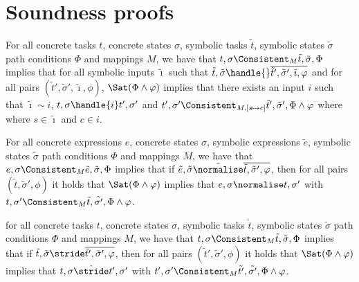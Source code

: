 
\section{Soundness proofs}
\label{sec:soundnessproofs}

\begin{lemma}
  \label{lem:soundhandle}

  For all concrete tasks $t$, concrete states $\sigma$, symbolic tasks $\tilde{t}$, symbolic states $\tilde{\sigma}$ path conditions $\Phi$ and mappings $M$,
  we have that $t,\sigma\Consistent_{M}\tilde{t},\tilde{\sigma},\Phi$ implies
  that for all symbolic inputs $\tilde{\imath}$ such that $\tilde{t},\tilde{\sigma}\handle{}\overline{\tilde{t}',\tilde{\sigma}',\tilde{\imath},\phi}$ and
  for all pairs $(\tilde{t}',\tilde{\sigma}',\tilde{\imath},\phi)$,
  $\Sat(\Phi\land\phi)$ implies that there exists an input $i$ such that $\tilde{\imath}\sim i$,  $t,\sigma\handle{i}t',\sigma'$ and $t',\sigma'\Consistent_{M.[s\mapsto c]}\tilde{t}',\tilde{\sigma}',\Phi\land\phi$ where where $s\in\tilde{\imath}$ and $c\in i$.

\end{lemma}



\begin{lemma}
  \label{lem:soundnorm}
  For all concrete expressions $e$, concrete states $\sigma$, symbolic expressions $\tilde{e}$, symbolic states $\tilde{\sigma}$ path conditions $\Phi$ and mappings $M$,
  we have that $e,\sigma\Consistent_{M}\tilde{e},\tilde{\sigma},\Phi$ implies
  that if $\tilde{e},\tilde{\sigma}\tilde{\normalise}\overline{\tilde{t},\tilde{\sigma}',\phi}$,
  then for all pairs $(\tilde{t},\tilde{\sigma}',\phi)$ it holds that $\Sat(\Phi\land\phi)$ implies
  that $e,\sigma\normalise t,\sigma'$ with $t,\sigma'\Consistent_{M}\tilde{t},\tilde{\sigma'},\Phi\land\phi$.
\end{lemma}

\begin{lemma}
  \label{lem:soundstride}
  for all concrete tasks $t$, concrete states $\sigma$, symbolic tasks $\tilde{t}$, symbolic states $\tilde{\sigma}$ path conditions $\Phi$ and mappings $M$,
  we have that $t,\sigma\Consistent_{M}\tilde{t},\tilde{\sigma},\Phi$ implies
  that if $\tilde{t},\tilde{\sigma}\stride\overline{\tilde{t}',\tilde{\sigma}',\phi}$,
  then for all pairs $(\tilde{t}',\tilde{\sigma}',\phi)$ it holds that $\Sat(\Phi\land\phi)$ implies
  that $t,\sigma\hat{\stride}t',\sigma'$ with $t',\sigma'\Consistent_{M}\tilde{t'},\tilde{\sigma'},\Phi\land\phi$.
\end{lemma}

